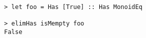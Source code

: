 \begin{repl}\begin{lstlisting}
> let foo = Has [True] :: Has MonoidEq

> elimHas isMempty foo
False\end{lstlisting}\end{repl}
